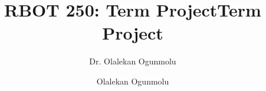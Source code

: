 \documentclass[10 pt, journal, twoside]{IEEEtran}
\title{RBOT 250: Term Project}
\author{Dr. Olalekan Ogunmolu}
\theoremstyle{remark}
\theoremstyle{definition}
\begin{document}
	\maketitle
	
	
	\title{Term Project}
	 
	\author{Olalekan Ogunmolu}



\providecommand\BIBentryALTinterwordstretchfactor{2.5}

%	
\end{document}
